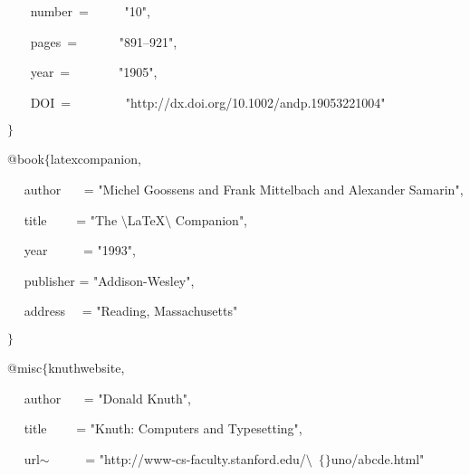\begin{itemize}
~~~ \hspace*{0.5in}number~=~~~~~  "10",\par

~~~ \hspace*{0.5in}pages~=~~~~~~  "891--921",\par

~~~ \hspace*{0.5in}year~=~~~~~~~  "1905",\par

~~~ \hspace*{0.5in}DOI~=~~~~~~~~  "http://dx.doi.org/10.1002/andp.19053221004"\par

$ \} $\par

 \par

@book$ \{ $latexcompanion,\par

 \hspace*{0.5in}~~ author~~~ = "Michel Goossens and Frank Mittelbach and Alexander Samarin",\par

 \hspace*{0.5in}~~ title~~~~ = "The $\setminus$LaTeX$\setminus$ Companion",\par

 \hspace*{0.5in}~~ year~~~~~ = "1993",\par

 \hspace*{0.5in}~~ publisher = "Addison-Wesley",\par

 \hspace*{0.5in}~~ address~~ = "Reading, Massachusetts"\par

$ \} $\par

 \par

@misc$ \{ $knuthwebsite,\par

 \hspace*{0.5in}~~ author~~~ = "Donald Knuth",\par

 \hspace*{0.5in}~~ title~~~~ = "Knuth: Computers and Typesetting",\par

 \hspace*{0.5in}~~ url$ \sim $~~~~~ = "http://www-cs-faculty.stanford.edu/$\setminus$~$ \{ $$ \} $uno/abcde.html"\par


\end{itemize}
